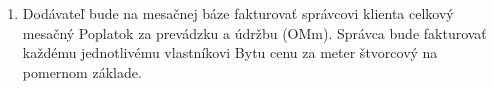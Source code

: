 \begin{enumerate}[label=\arabic*.]
\begin{center}
\end{center}
	\item Dodávateľ bude na mesačnej báze fakturovať správcovi klienta celkový mesačný Poplatok za prevádzku a údržbu (OMm). Správca bude fakturovať každému jednotlivému vlastníkovi Bytu cenu za meter štvorcový na pomernom základe.
\end{enumerate}
